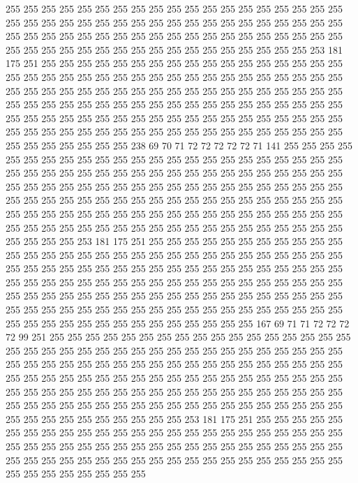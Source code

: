 255 255 255 255 255 255 255 255 255 255 255 255 255 255 255 255 255 255 255 255
255 255 255 255 255 255 255 255 255 255 255 255 255 255 255 255 255 255 255 255
255 255 255 255 255 255 255 255 255 255 255 255 255 255 255 255 255 255 255 255
255 255 255 255 255 255 255 255 255 255 255 255 255 255 253 181 175 251 255 255
255 255 255 255 255 255 255 255 255 255 255 255 255 255 255 255 255 255 255 255
255 255 255 255 255 255 255 255 255 255 255 255 255 255 255 255 255 255 255 255
255 255 255 255 255 255 255 255 255 255 255 255 255 255 255 255 255 255 255 255
255 255 255 255 255 255 255 255 255 255 255 255 255 255 255 255 255 255 255 255
255 255 255 255 255 255 255 255 255 255 255 255 255 255 255 255 255 255 255 255
255 255 255 255 255 255 255 255 255 255 255 255 255 255 255 255 255 238 69 70
71 72 72 72 72 72 71 141 255 255 255 255 255 255 255 255 255 255 255 255
255 255 255 255 255 255 255 255 255 255 255 255 255 255 255 255 255 255 255 255
255 255 255 255 255 255 255 255 255 255 255 255 255 255 255 255 255 255 255 255
255 255 255 255 255 255 255 255 255 255 255 255 255 255 255 255 255 255 255 255
255 255 255 255 255 255 255 255 255 255 255 255 255 255 255 255 255 255 255 255
255 255 255 255 255 255 255 255 255 255 255 255 255 255 255 255 255 255 255 255
255 255 255 255 255 255 255 255 255 255 253 181 175 251 255 255 255 255 255 255
255 255 255 255 255 255 255 255 255 255 255 255 255 255 255 255 255 255 255 255
255 255 255 255 255 255 255 255 255 255 255 255 255 255 255 255 255 255 255 255
255 255 255 255 255 255 255 255 255 255 255 255 255 255 255 255 255 255 255 255
255 255 255 255 255 255 255 255 255 255 255 255 255 255 255 255 255 255 255 255
255 255 255 255 255 255 255 255 255 255 255 255 255 255 255 255 255 255 255 255
255 255 255 255 255 255 255 255 255 255 255 255 255 255 167 69 71 71 72 72
72 72 99 251 255 255 255 255 255 255 255 255 255 255 255 255 255 255 255 255
255 255 255 255 255 255 255 255 255 255 255 255 255 255 255 255 255 255 255 255
255 255 255 255 255 255 255 255 255 255 255 255 255 255 255 255 255 255 255 255
255 255 255 255 255 255 255 255 255 255 255 255 255 255 255 255 255 255 255 255
255 255 255 255 255 255 255 255 255 255 255 255 255 255 255 255 255 255 255 255
255 255 255 255 255 255 255 255 255 255 255 255 255 255 255 255 255 255 255 255
255 255 255 255 255 255 253 181 175 251 255 255 255 255 255 255 255 255 255 255
255 255 255 255 255 255 255 255 255 255 255 255 255 255 255 255 255 255 255 255
255 255 255 255 255 255 255 255 255 255 255 255 255 255 255 255 255 255 255 255
255 255 255 255 255 255 255 255 255 255 255 255 255 255 255 255 255 255 255 255
